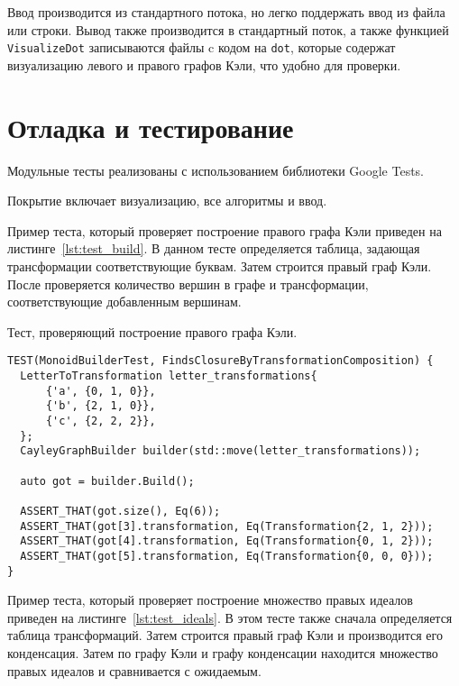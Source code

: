 \documentclass[14pt, russian]{scrartcl}
\begin{document}
Ввод производится из стандартного потока, но легко поддержать ввод из файла или
строки. Вывод также производится в стандартный поток, а также функцией
\verb|VisualizeDot| записываются файлы c кодом на \verb|dot|, которые содержат
визуализацию левого и правого графов Кэли, что удобно для проверки.

\newpage
\section{Отладка и тестирование}

Модульные тесты реализованы с использованием библиотеки Google Tests.

Покрытие включает визуализацию, все алгоритмы и ввод.

Пример теста, который проверяет построение правого графа Кэли приведен на
листинге~\ref{lst:test_build}. В данном тесте определяется таблица, задающая
трансформации соответствующие буквам. Затем строится правый граф Кэли. После
проверяется количество вершин в графе и трансформации, соответствующие
добавленным вершинам.

\begin{listing}[!htb]
\caption{Тест, проверяющий построение правого графа Кэли.}
\label{lst:test_build}
  \begin{verbatim}
TEST(MonoidBuilderTest, FindsClosureByTransformationComposition) {
  LetterToTransformation letter_transformations{
      {'a', {0, 1, 0}},
      {'b', {2, 1, 0}},
      {'c', {2, 2, 2}},
  };
  CayleyGraphBuilder builder(std::move(letter_transformations));

  auto got = builder.Build();

  ASSERT_THAT(got.size(), Eq(6));
  ASSERT_THAT(got[3].transformation, Eq(Transformation{2, 1, 2}));
  ASSERT_THAT(got[4].transformation, Eq(Transformation{0, 1, 2}));
  ASSERT_THAT(got[5].transformation, Eq(Transformation{0, 0, 0}));
}
  \end{verbatim}
\end{listing}

Пример теста, который проверяет построение множество правых идеалов приведен на
листинге~\ref{lst:test_ideals}. В этом тесте также сначала определяется таблица
трансформаций. Затем строится правый граф Кэли и производится его конденсация.
Затем по графу Кэли и графу конденсации находится множество правых идеалов и
сравнивается с ожидаемым.
\end{document}
